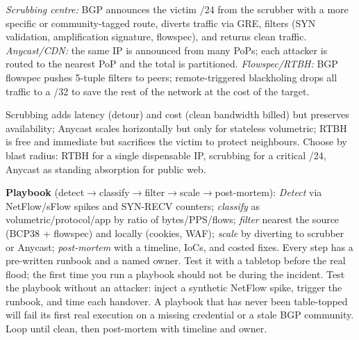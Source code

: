 \emph{Scrubbing centre:} BGP announces the victim /24 from the scrubber with a more specific or community-tagged route, diverts traffic via GRE, filters (SYN validation, amplification signature, flowspec), and returns clean traffic. \emph{Anycast/CDN:} the same IP is announced from many PoPs; each attacker is routed to the nearest PoP and the total is partitioned. \emph{Flowspec/RTBH:} BGP flowspec pushes 5-tuple filters to peers; remote-triggered blackholing drops all traffic to a /32 to save the rest of the network at the cost of the target.

Scrubbing adds latency (detour) and cost (clean bandwidth billed) but preserves availability; Anycast scales horizontally but only for stateless volumetric; RTBH is free and immediate but sacrifices the victim to protect neighbours. Choose by blast radius: RTBH for a single dispensable IP, scrubbing for a critical /24, Anycast as standing absorption for public web.

\vspace{0.2em}
\noindent\textbf{Playbook} (detect$\to$classify$\to$filter$\to$scale$\to$post-mortem):
\textit{Detect} via NetFlow/sFlow spikes and SYN-RECV counters; \textit{classify} as volumetric/protocol/app by ratio of bytes/PPS/flows; \textit{filter} nearest the source (BCP38 + flowspec) and locally (cookies, WAF); \textit{scale} by diverting to scrubber or Anycast; \textit{post-mortem} with a timeline, IoCs, and costed fixes. Every step has a pre-written runbook and a named owner. Test it with a tabletop before the real flood; the first time you run a playbook should not be during the incident.
Test the playbook without an attacker: inject a synthetic NetFlow spike, trigger the runbook, and time each handover. A playbook that has never been table-topped will fail its first real execution on a missing credential or a stale BGP community. Loop until clean, then post-mortem with timeline and owner.


